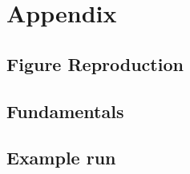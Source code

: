 \appendix
\part*{Appendix}
\chapter{Figure Reproduction}\label{apdx:figure_repoduction}


\chapter{Fundamentals}\label{apdx:fundamentals}


\chapter{Example  run}\label{apdx:eg_run}

